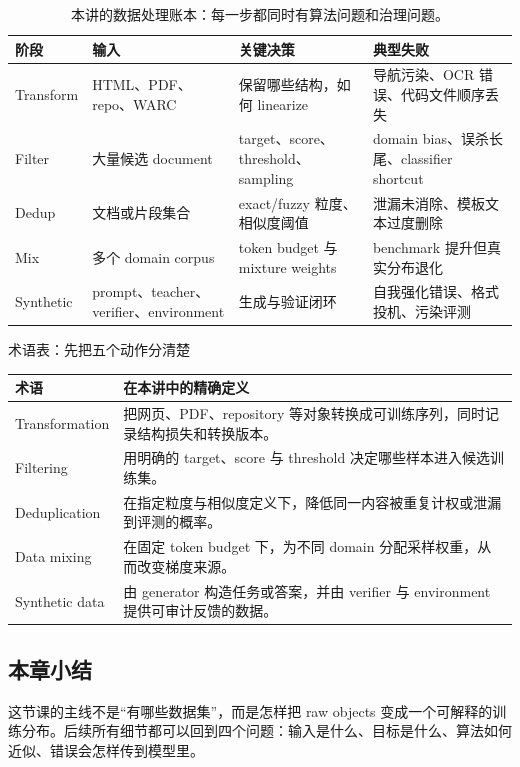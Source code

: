 \documentclass[a4paper]{article}
\begin{document}
\begin{table}[H]
\centering
\begin{tabular}{L{0.14\textwidth}L{0.25\textwidth}L{0.25\textwidth}L{0.22\textwidth}}
\toprule
阶段 & 输入 & 关键决策 & 典型失败 \\
\midrule
Transform & HTML、PDF、repo、WARC & 保留哪些结构，如何 linearize & 导航污染、OCR 错误、代码文件顺序丢失 \\
Filter & 大量候选 document & target、score、threshold、sampling & domain bias、误杀长尾、classifier shortcut \\
Dedup & 文档或片段集合 & exact/fuzzy 粒度、相似度阈值 & 泄漏未消除、模板文本过度删除 \\
Mix & 多个 domain corpus & token budget 与 mixture weights & benchmark 提升但真实分布退化 \\
Synthetic & prompt、teacher、verifier、environment & 生成与验证闭环 & 自我强化错误、格式投机、污染评测 \\
\bottomrule
\end{tabular}
\caption{本讲的数据处理账本：每一步都同时有算法问题和治理问题。}
\end{table}

\begin{knowledgebox}{术语表：先把五个动作分清楚}
\begin{tabular}{L{0.18\textwidth}L{0.72\textwidth}}
\toprule
术语 & 在本讲中的精确定义 \\
\midrule
Transformation & 把网页、PDF、repository 等对象转换成可训练序列，同时记录结构损失和转换版本。 \\
Filtering & 用明确的 target、score 与 threshold 决定哪些样本进入候选训练集。 \\
Deduplication & 在指定粒度与相似度定义下，降低同一内容被重复计权或泄漏到评测的概率。 \\
Data mixing & 在固定 token budget 下，为不同 domain 分配采样权重，从而改变梯度来源。 \\
Synthetic data & 由 generator 构造任务或答案，并由 verifier 与 environment 提供可审计反馈的数据。 \\
\bottomrule
\end{tabular}
\end{knowledgebox}

\subsection{本章小结}

这节课的主线不是“有哪些数据集”，而是怎样把 raw objects 变成一个可解释的训练分布。后续所有细节都可以回到四个问题：输入是什么、目标是什么、算法如何近似、错误会怎样传到模型里。
\end{document}
